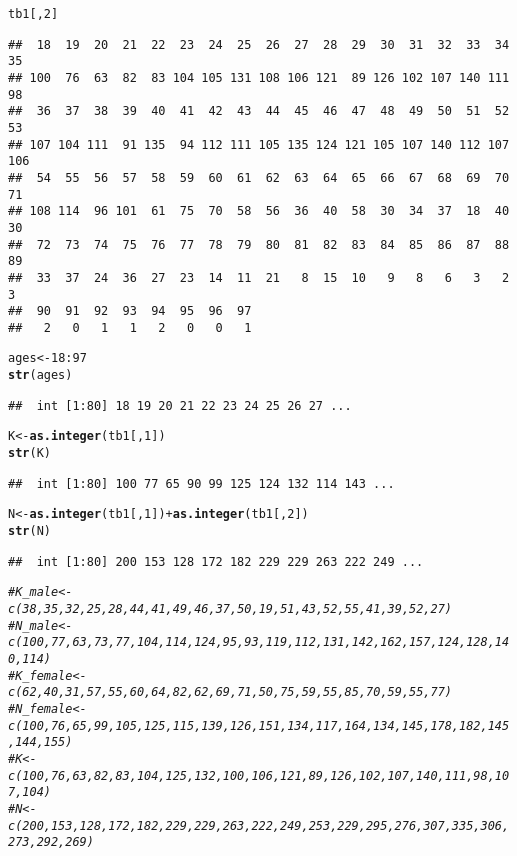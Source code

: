 \documentclass{article}\usepackage[]{graphicx}\usepackage[]{color}
\makeatletter
\newcommand{\hlnum}[1]{\textcolor[rgb]{0.686,0.059,0.569}{#1}}%
\newcommand{\hlcom}[1]{\textcolor[rgb]{0.678,0.584,0.686}{\textit{#1}}}%
\newcommand{\hlopt}[1]{\textcolor[rgb]{0,0,0}{#1}}%
\newcommand{\hlstd}[1]{\textcolor[rgb]{0.345,0.345,0.345}{#1}}%
\newcommand{\hlkwb}[1]{\textcolor[rgb]{0.69,0.353,0.396}{#1}}%
\newcommand{\hlkwd}[1]{\textcolor[rgb]{0.737,0.353,0.396}{\textbf{#1}}}%
\newenvironment{kframe}{%
 \def\at@end@of@kframe{}%
 \ifinner\ifhmode%
  \def\at@end@of@kframe{\end{minipage}}%
  \begin{minipage}{\columnwidth}%
 \fi\fi%
 \def\FrameCommand##1{\hskip\@totalleftmargin \hskip-\fboxsep
 \colorbox{shadecolor}{##1}\hskip-\fboxsep
     \hskip-\linewidth \hskip-\@totalleftmargin \hskip\columnwidth}%
 \MakeFramed {\advance\hsize-\width
   \@totalleftmargin\z@ \linewidth\hsize
   \@setminipage}}%
 {\par\unskip\endMakeFramed%
 \at@end@of@kframe}
\newenvironment{knitrout}{}{} %
\makeatother
\begin{document}
\begin{knitrout}
\begin{kframe}
\begin{alltt}
\hlstd{tb1[,}\hlnum{2}\hlstd{]}
\end{alltt}
\begin{verbatim}
##  18  19  20  21  22  23  24  25  26  27  28  29  30  31  32  33  34  35 
## 100  76  63  82  83 104 105 131 108 106 121  89 126 102 107 140 111  98 
##  36  37  38  39  40  41  42  43  44  45  46  47  48  49  50  51  52  53 
## 107 104 111  91 135  94 112 111 105 135 124 121 105 107 140 112 107 106 
##  54  55  56  57  58  59  60  61  62  63  64  65  66  67  68  69  70  71 
## 108 114  96 101  61  75  70  58  56  36  40  58  30  34  37  18  40  30 
##  72  73  74  75  76  77  78  79  80  81  82  83  84  85  86  87  88  89 
##  33  37  24  36  27  23  14  11  21   8  15  10   9   8   6   3   2   3 
##  90  91  92  93  94  95  96  97 
##   2   0   1   1   2   0   0   1
\end{verbatim}
\begin{alltt}
\hlstd{ages}     \hlkwb{<-}\hlnum{18}\hlopt{:}\hlnum{97}
\hlkwd{str}\hlstd{(ages)}
\end{alltt}
\begin{verbatim}
##  int [1:80] 18 19 20 21 22 23 24 25 26 27 ...
\end{verbatim}
\begin{alltt}
\hlstd{K}        \hlkwb{<-}\hlkwd{as.integer}\hlstd{(tb1[,}\hlnum{1}\hlstd{])}
\hlkwd{str}\hlstd{(K)}
\end{alltt}
\begin{verbatim}
##  int [1:80] 100 77 65 90 99 125 124 132 114 143 ...
\end{verbatim}
\begin{alltt}
\hlstd{N}        \hlkwb{<-}\hlkwd{as.integer}\hlstd{(tb1[,}\hlnum{1}\hlstd{])}\hlopt{+}\hlkwd{as.integer}\hlstd{(tb1[,}\hlnum{2}\hlstd{])}
\hlkwd{str}\hlstd{(N)}
\end{alltt}
\begin{verbatim}
##  int [1:80] 200 153 128 172 182 229 229 263 222 249 ...
\end{verbatim}
\begin{alltt}
\hlcom{#K_male   <-c( 38, 35, 32, 25, 28, 44, 41, 49, 46, 37, 50, 19, 51, 43, 52, 55, 41, 39, 52, 27)}
\hlcom{#N_male   <-c(100, 77, 63, 73, 77,104,114,124, 95, 93,119,112,131,142,162,157,124,128,140,114)}
\hlcom{#K_female <-c( 62, 40, 31, 57, 55, 60, 64, 82, 62, 69, 71, 50, 75, 59, 55, 85, 70, 59, 55, 77)}
\hlcom{#N_female <-c(100, 76, 65, 99,105,125,115,139,126,151,134,117,164,134,145,178,182,145,144,155)}
\hlcom{#K        <-c(100, 76, 63, 82, 83,104,125,132,100,106,121, 89,126,102,107,140,111, 98,107,104)}
\hlcom{#N        <-c(200,153,128,172,182,229,229,263,222,249,253,229,295,276,307,335,306,273,292,269)}


\end{alltt}
\end{kframe}
\end{knitrout}
\end{document}

